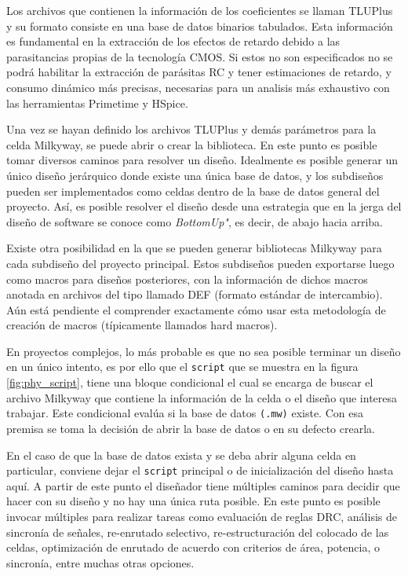 Los archivos que contienen la información de los coeficientes se llaman TLUPlus y su formato consiste en una base de datos binarios tabulados. Esta información es fundamental en la extracción de los efectos de retardo debido a las parasitancias propias de la tecnología CMOS. Si estos no son especificados no se podrá habilitar la extracción de parásitas RC y tener estimaciones de retardo, y consumo dinámico más precisas, necesarias para un analisis más exhaustivo con las herramientas Primetime y HSpice.

Una vez se hayan definido los archivos TLUPlus y demás parámetros para la celda Milkyway, se puede abrir o crear la biblioteca. En este punto es posible tomar diversos caminos para resolver un diseño. Idealmente es posible generar un único diseño jerárquico donde existe una única base de datos, y los subdiseños pueden ser implementados como celdas dentro de la base de datos general del proyecto. Así, es posible resolver el diseño desde una estrategia que en la jerga del diseño de software se conoce como \textit{BottomUp"}, es decir, de abajo hacia arriba.

Existe otra posibilidad en la que se pueden generar bibliotecas Milkyway para cada subdiseño del proyecto principal. Estos subdiseños pueden exportarse luego como macros para diseños posteriores, con la información de dichos macros anotada en archivos del tipo llamado DEF (formato estándar de intercambio). Aún está pendiente el comprender exactamente cómo usar esta metodología de creación de macros (típicamente llamados hard macros). 

En proyectos complejos, lo más probable es que no sea posible terminar un diseño en un único intento, es por ello que el \texttt{script} que se muestra en la figura \ref{fig:phy_script}, tiene una bloque condicional el cual se encarga de buscar el archivo Milkyway que contiene la información de la celda o el diseño que interesa trabajar. Este condicional evalúa si la base de datos \texttt{(.mw)} existe. Con esa premisa se toma la decisión de abrir la base de datos o en su defecto crearla.

En el caso de que la base de datos exista y se deba abrir alguna celda en particular, conviene dejar el \texttt{script} principal o de inicialización del diseño hasta aquí. A partir de este punto el diseñador tiene múltiples caminos para decidir que hacer con su diseño y no hay una única ruta posible. En este punto es posible invocar múltiples para realizar tareas como evaluación de reglas DRC, análisis de sincronía de señales, re-enrutado selectivo, re-estructuración del colocado de las celdas, optimización de enrutado de acuerdo con criterios de área, potencia, o sincronía, entre muchas otras opciones.

